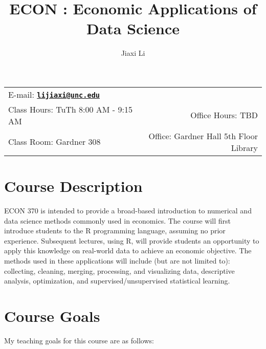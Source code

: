 \documentclass[11pt]{article}
\title{ECON \CourseNum: Economic Applications of Data Science} %
\author{Jiaxi Li}                                            %
\date{\SemSeason \SemYear}                                     %
\newcommand{\CourseNum}{370\xspace}         %
\begin{document}
\maketitle

\begin{tabular*}{\textwidth}{@{\extracolsep{\fill}}lr}

E-mail: \href{mailto:lijiaxi@unc.edu}{\tt\bf lijiaxi@unc.edu} \\

Class Hours: TuTh 8:00 AM - 9:15 AM & Office Hours: TBD \\

Class Room: Gardner 308 & Office: Gardner Hall 5th Floor Library \\
\hline
\end{tabular*}
\vspace{2 mm}

\section*{Course Description}
ECON \CourseNum is intended to provide a broad-based introduction to numerical and data science methods commonly used in economics. The course will first introduce students to the R programming language, assuming no prior experience. Subsequent lectures, using R, will provide students an opportunity to apply this knowledge on real-world data to achieve an economic objective.  The methods used in these applications will include (but are not limited to): collecting, cleaning, merging, processing, and visualizing data, descriptive analysis, optimization, and supervised/unsupervised statistical learning.

\section*{Course Goals}
My teaching goals for this course are as follows:
\end{document}
